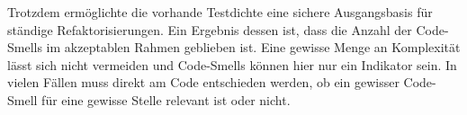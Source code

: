 Trotzdem ermöglichte die vorhande Testdichte eine sichere Ausgangsbasis für ständige Refaktorisierungen. Ein Ergebnis dessen ist, dass die Anzahl der Code-Smells im akzeptablen Rahmen geblieben ist. Eine gewisse Menge an Komplexität lässt sich nicht vermeiden und Code-Smells können hier nur ein Indikator sein. In vielen Fällen muss direkt am Code entschieden werden, ob ein gewisser Code-Smell für eine gewisse Stelle relevant ist oder nicht.
